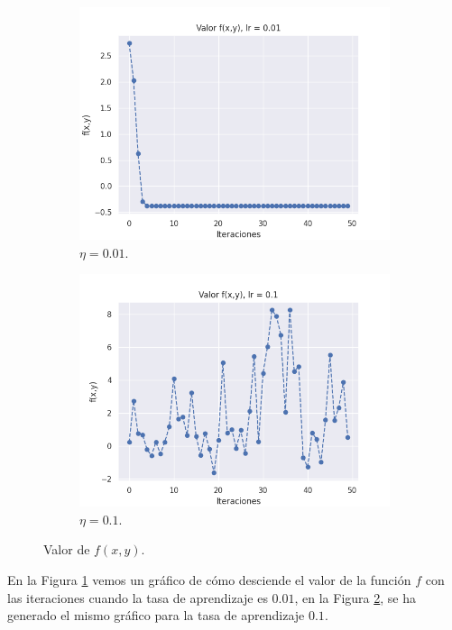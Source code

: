 \documentclass[a4paper, 20pt]{article}
\begin{document}
\begin{figure}[H]
\centering
\begin{subfigure}{0.5\textwidth}
  \centering
  \includegraphics[width=1\linewidth]{1lr0_01}
  \caption{$\eta = 0.01$.}
  \label{fig:0.01}
\end{subfigure}%
\begin{subfigure}{.5\textwidth}
  \centering
  \includegraphics[width=1\linewidth]{1lr0_1}
  \caption{$\eta = 0.1$.}
  \label{fig:0.1}
\end{subfigure}
\caption{Valor de $f(x,y)$.}
\label{fig:test}
\end{figure}

En la Figura \ref{fig:0.01} vemos un gráfico de cómo desciende el valor de la función $f$ con las iteraciones cuando la tasa de aprendizaje es $0.01$, en la Figura \ref{fig:0.1}, se ha generado el mismo gráfico para la tasa de aprendizaje $0.1$.
\end{document}
